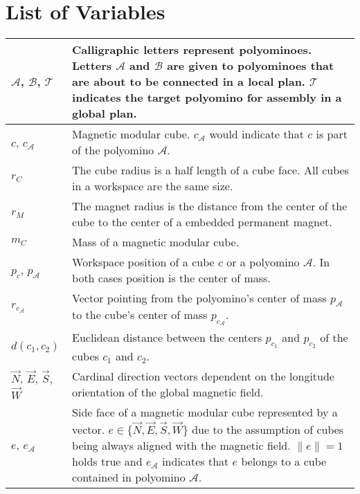 \chapter*{List of Variables}

\begin{xltabular}{\textwidth}{ l  X }
	\toprule
	
	$\mathcal{A}$, $\mathcal{B}$, $\mathcal{T}$
	&
	Calligraphic letters represent polyominoes.
	Letters $\mathcal{A}$ and $\mathcal{B}$ are given to polyominoes that are about to be connected in a local plan.
	$\mathcal{T}$ indicates the target polyomino for assembly in a global plan.
	\\ \midrule
	
	$c$, $c_\mathcal{A}$
	&
	Magnetic modular cube. $c_\mathcal{A}$ would indicate that $c$ is part of the polyomino $\mathcal{A}$.
	\\ \midrule
	
	$r_C$
	&
	The cube radius is a half length of a cube face.
	All cubes in a workspace are the same size.
	\\ \midrule
	
	$r_M$
	&
	The magnet radius is the distance from the center of the cube to the center of a embedded permanent magnet.
	\\ \midrule
	
	$m_C$
	&
	Mass of a magnetic modular cube.
	\\ \midrule
	
	$p_c$, $p_\mathcal{A}$ 
	&
	Workspace position of a cube $c$ or a polyomino $\mathcal{A}$.
	In both cases position is the center of mass.
	\\ \midrule
	
	$r_{c_\mathcal{A}}$  
	&
	Vector pointing from the polyomino's center of mass $p_\mathcal{A}$ to the cube's center of mass $p_{c_\mathcal{A}}$. 
	\\ \midrule
	
	$d(c_1, c_2)$  
	&
	Euclidean distance between the centers $p_{c_1}$ and $p_{c_2}$ of the cubes $c_1$ and $c_2$.
	\\ \midrule
	
	$\vec{N}$, $\vec{E}$, $\vec{S}$, $\vec{W}$
	&
	Cardinal direction vectors dependent on the longitude orientation of the global magnetic field.
	\\ \midrule
	
	$e$, $e_\mathcal{A}$
	&
	Side face of a magnetic modular cube represented by a vector.
	$e \in \{ \vec{N},\vec{E},\vec{S},\vec{W}\}$ due to the assumption of cubes being always aligned with the magnetic field. 
	$\lVert e \rVert = 1$ holds true and $e_\mathcal{A}$ indicates that $e$ belongs to a cube contained in polyomino $\mathcal{A}$.
	\\ \midrule
	

\end{xltabular}
